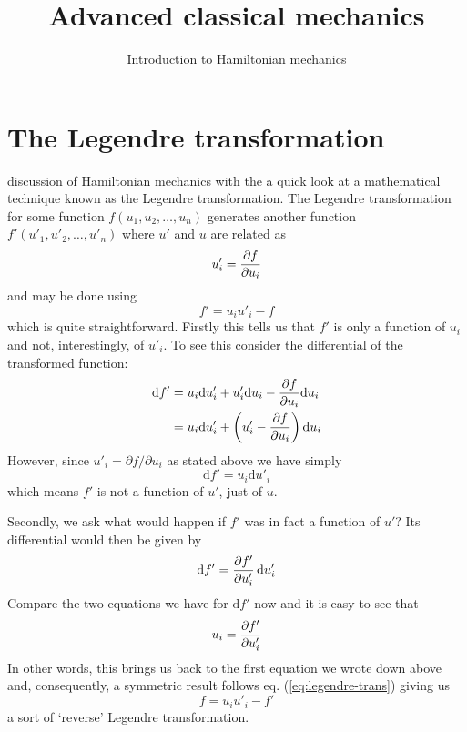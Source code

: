 \documentclass[english,seminar,headertitle]{lecture}
\title{Advanced classical mechanics}
\subtitle{Introduction to Hamiltonian mechanics}
\author{}
\date{}{}{}
\begin{document}
\section{The Legendre transformation}

\noindent{} discussion of Hamiltonian mechanics with the a quick look at a mathematical technique known as the Legendre transformation. The Legendre transformation for some function $f(u_1,u_2,\ldots,u_n)$ generates another function $f'(u'_1,u'_2,\ldots,u'_n)$ where $u'$ and $u$ are related as $$u'_i = {\partial f \over \partial u_i}$$ and may be done using
\begin{equation}
	f' = u_iu'_i - f \label{eq:legendre-trans}
\end{equation}%
%
which is quite straightforward. Firstly this tells us that $f'$ is only a function of $u_i$ and not, interestingly, of $u'_i$. To see this consider the differential of the transformed function:
\begin{align*}
	\textrm{d}f' &= u_i \textrm{d}u'_i + u'_i \textrm{d}u_i - {\partial f \over \partial u_i} \textrm{d} u_i \\
	&= u_i \textrm{d}u'_i + \left( u'_i - {\partial f \over \partial u_i} \right) \textrm{d} u_i
\end{align*}
However, since $u'_i = \partial f / \partial u_i$ as stated above we have simply $$\textrm{d}f' = u_i \textrm{d}u'_i$$
which means $f'$ is not a function of $u'$, just of $u$.

Secondly, we ask what would happen if $f'$ was in fact a function of $u'$? Its differential would then be given by $$\textrm{d}f' = {\partial f' \over \partial u'_i} \, \textrm{d} u'_i$$
Compare the two equations we have for $\textrm{d}f'$ now and it is easy to see that $$u_i = {\partial f' \over \partial u'_i}$$
In other words, this brings us back to the first equation we wrote down above and, consequently, a symmetric result follows eq. (\ref{eq:legendre-trans}) giving us
\begin{equation}
	f = u_iu'_i - f' \label{eq:legrendre-inverse}
\end{equation}
a sort of `reverse' Legendre transformation.
\end{document}
